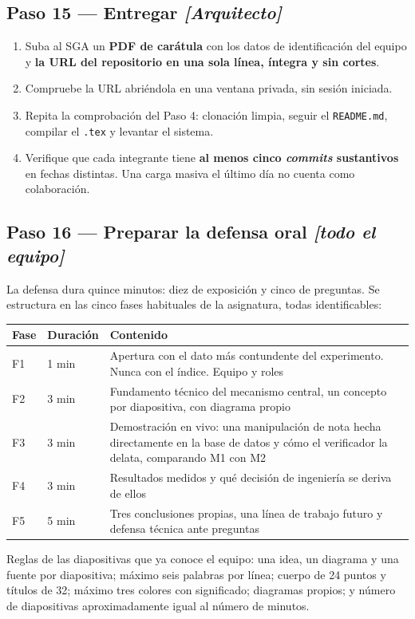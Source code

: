 \documentclass[11pt,a4paper]{article}
\newcommand{\paso}[1]{\subsection{#1}}
\begin{document}
	\paso{Paso 15 --- Entregar \emph{[Arquitecto]}}
	
	\begin{enumerate}[leftmargin=*,itemsep=4pt]
		\item Suba al SGA un \textbf{PDF de carátula} con los datos de identificación del equipo y \textbf{la URL del repositorio en una sola línea, íntegra y sin cortes}.
		\item Compruebe la URL abriéndola en una ventana privada, sin sesión iniciada.
		\item Repita la comprobación del Paso 4: clonación limpia, seguir el \texttt{README.md}, compilar el \texttt{.tex} y levantar el sistema.
		\item Verifique que cada integrante tiene \textbf{al menos cinco \emph{commits} sustantivos} en fechas distintas. Una carga masiva el último día no cuenta como colaboración.
	\end{enumerate}
	
	\paso{Paso 16 --- Preparar la defensa oral \emph{[todo el equipo]}}
	
	La defensa dura quince minutos: diez de exposición y cinco de preguntas. Se estructura en las cinco fases habituales de la asignatura, todas identificables:
	
	\begin{center}
		\small
		\begin{tabular}{@{}p{1.1cm}p{3.5cm}p{10.3cm}@{}}
			\toprule
			\textbf{Fase} & \textbf{Duración} & \textbf{Contenido} \\
			\midrule
			F1 & 1 min & Apertura con el dato más contundente del experimento. Nunca con el índice. Equipo y roles \\
			F2 & 3 min & Fundamento técnico del mecanismo central, un concepto por diapositiva, con diagrama propio \\
			F3 & 3 min & Demostración en vivo: una manipulación de nota hecha directamente en la base de datos y cómo el verificador la delata, comparando M1 con M2 \\
			F4 & 3 min & Resultados medidos y qué decisión de ingeniería se deriva de ellos \\
			F5 & 5 min & Tres conclusiones propias, una línea de trabajo futuro y defensa técnica ante preguntas \\
			\bottomrule
		\end{tabular}
	\end{center}
	
	Reglas de las diapositivas que ya conoce el equipo: una idea, un diagrama y una fuente por diapositiva; máximo seis palabras por línea; cuerpo de 24 puntos y títulos de 32; máximo tres colores con significado; diagramas propios; y número de diapositivas aproximadamente igual al número de minutos.
	
\end{document}
